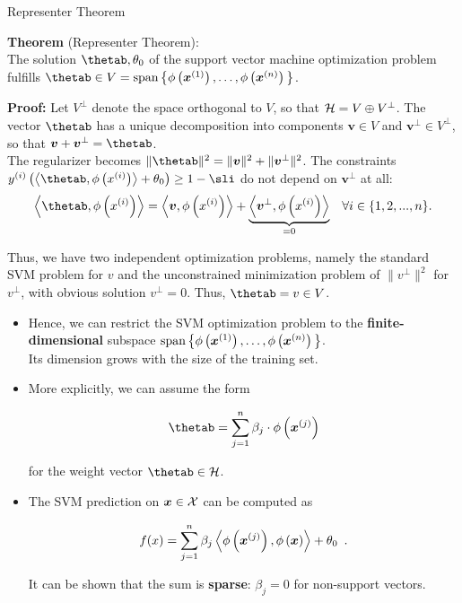\begin{vbframe}{Representer Theorem}

  \textbf{Theorem} (Representer Theorem):\\
  The solution $\thetab, \theta_0$ of the support vector machine optimization problem fulfills $\thetab \in V = \spn\big\{\phi\left(\xv^{(1)}\right), \dots, \phi\left(\xv^{(n)}\right)\big\}$.\\

  \vspace*{0.2cm}

  \begin{footnotesize}
  \textbf{Proof:} Let $V^\perp$ denote the space orthogonal to $V$,
  so that $\mathcal{H} = V \oplus V^\perp$. The vector $\thetab$ has a
  unique decomposition into components $\bm{v} \in V$ and $\bm{v} ^\perp \in V^\perp$,
  so that $\bm{v}  + \bm{v} ^\perp = \thetab$.\\[0.5em]

  The regularizer becomes $\|\thetab\|^2 = \|\bm{v} \|^2 + \|\bm{v} ^\perp\|^2$.
  The constraints $\yi  \left( \scp{\thetab}{\phi\left(\xi\right)} + \theta_0\right) \geq 1 - \sli$
  do not depend on $\bm{v} ^\perp$ at all:
  $$
    \scp{\thetab}{\phi\left(\xi\right)} = \scp{\bm{v} }{\phi\left(\xi\right)} + \underbrace{\scp{\bm{v}^\perp}{\phi\left(\xi \right)}}_{= 0}
    \enspace ~ \forall i \in \{1, 2, ..., n\}.
  $$

  Thus, we have two independent optimization problems, namely the
  standard SVM problem for $v$ and the unconstrained minimization
  problem of $\|v^\perp\|^2$ for $v^\perp$, with obvious solution
  $v^\perp = 0$. Thus, $\thetab = v \in V$.
  \end{footnotesize}

  \framebreak

  \begin{itemize}
    \item Hence, we can restrict the SVM optimization problem
    to the \textbf{finite-dimensional} subspace
    $\operatorname{span}\big\{\phi\left(\bm{x}^{(1)}\right), \dots, \phi\left(\bm{x}^{(n)}\right)\big\}$.\\
    Its dimension grows with the size of the
    training set.
    \item More explicitly, we can assume the form
    \begin{footnotesize}
    $$ \thetab = \sum_{j=1}^n \beta_j \cdot \phi\left(\xv^{(j)}\right) $$
    \end{footnotesize}
    for the weight vector $\thetab\in \HS$.
      \item The SVM prediction on $\bm{x} \in \mathcal{X}$ can be computed as
    \begin{footnotesize}
    $$
    f(x) = \sum_{j = 1}^n \beta_j \left\langle \phi\left(\bm{x}^{(j)}\right), \phi\left(\bm{x}\right) \right\rangle + \theta_0
    \enspace.
    $$
    \end{footnotesize}


    It can be shown that the sum is \textbf{sparse}: $\beta_j = 0$ for non-support vectors.

  \end{itemize}

\end{vbframe}

\endlecture
